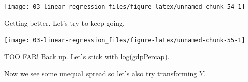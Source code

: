 \documentclass[
]{book}
\newenvironment{Shaded}{\begin{snugshade}}{\end{snugshade}}
\newcommand{\CommentTok}[1]{\textcolor[rgb]{0.56,0.35,0.01}{\textit{#1}}}
\newcommand{\DataTypeTok}[1]{\textcolor[rgb]{0.13,0.29,0.53}{#1}}
\newcommand{\DecValTok}[1]{\textcolor[rgb]{0.00,0.00,0.81}{#1}}
\newcommand{\KeywordTok}[1]{\textcolor[rgb]{0.13,0.29,0.53}{\textbf{#1}}}
\newcommand{\NormalTok}[1]{#1}
\newcommand{\OperatorTok}[1]{\textcolor[rgb]{0.81,0.36,0.00}{\textbf{#1}}}
\newcommand{\StringTok}[1]{\textcolor[rgb]{0.31,0.60,0.02}{#1}}
\begin{document}
\begin{center}\texttt{[image: 03-linear-regression\_files/figure-latex/unnamed-chunk-54-1]} \end{center}

Getting better. Let's try to keep going.

\begin{Shaded}
\end{Shaded}

\begin{center}\texttt{[image: 03-linear-regression\_files/figure-latex/unnamed-chunk-55-1]} \end{center}

TOO FAR! Back up. Let's stick with log(gdpPercap).

Now we see some unequal spread so let's also try transforming \(Y\).

\begin{Shaded}
\end{Shaded}
\end{document}
